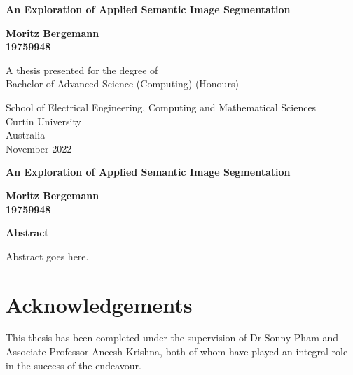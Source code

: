 \documentclass[a4paper,12pt]{report}
\begin{document}
{}
\begin{titlepage}
    \begin{center}
        \vspace*{0.5cm}

        \LARGE
        \textbf{An Exploration of Applied Semantic Image Segmentation}


        \vspace{1.0cm}
        \Large

        \textbf{Moritz Bergemann\\ 19759948}

        \vfill

        A thesis presented for the degree of\\
        Bachelor of Advanced Science (Computing) (Honours)

        \vspace{2.5cm}


        \large
        School of Electrical Engineering, Computing and Mathematical Sciences\\
        Curtin University\\
        Australia\\
        November 2022

    \end{center}
\end{titlepage}

\thispagestyle{plain}
\begin{center}
    \Large
    \textbf{An Exploration of Applied Semantic Image Segmentation}

    \vspace{0.4cm}
    \large

    \vspace{0.4cm}
    \textbf{Moritz Bergemann\\ 19759948}

    \vspace{0.9cm}
    \textbf{Abstract}
\end{center}

Abstract goes here.

\newpage
\chapter*{Acknowledgements}
This thesis has been completed under the supervision of Dr Sonny Pham and Associate Professor Aneesh Krishna, both of whom have played an integral role in the success of the endeavour.
\end{document}
